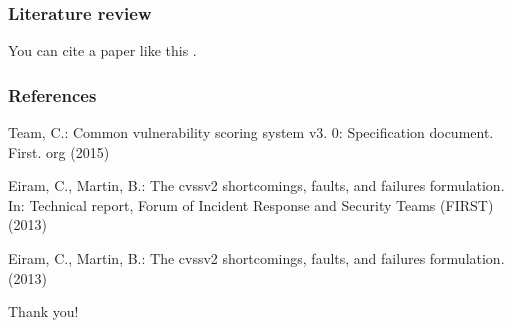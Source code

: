 \documentclass[14pt]{beamer}
\begin{document}
\begin{frame}
\frametitle{Literature review}
You can cite a paper like this \cite{team2015common,eiram2013cvssv2,eiram2013}.
\end{frame}


\begin{frame}
\frametitle{References}

\begin{thebibliography}{99} %

Team, C.: Common vulnerability scoring system v3. 0: Specification document.
  First. org  (2015)
  
Eiram, C., Martin, B.: The cvssv2 shortcomings, faults, and failures
  formulation. In: Technical report, Forum of Incident Response and Security
  Teams (FIRST) (2013)
  
Eiram, C., Martin, B.: The cvssv2 shortcomings, faults, and failures
  formulation. (2013)
  

\end{thebibliography}
\end{frame}

\begin{frame}
\Huge{\centerline{Thank you!}}
\end{frame}


\end{document}
